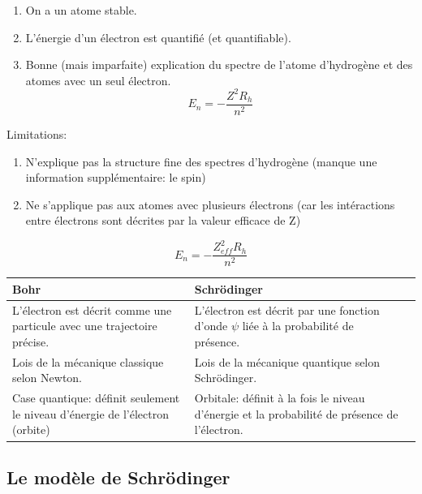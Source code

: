 \documentclass[10pt,a4paper]{book}
\begin{document}
\begin{enumerate}
\item On a un atome stable.
\item L'énergie d'un électron est quantifié (et quantifiable).
\item Bonne (mais imparfaite) explication du spectre de l'atome d'hydrogène et des atomes avec un seul électron.
\begin{displaymath}
E_n = -\frac{{Z^2}{R_h}}{n^2}
\end{displaymath}
\end{enumerate}
Limitations:
\begin{enumerate}
\item N'explique pas la structure fine des spectres d'hydrogène (manque une information supplémentaire: le spin)
\item Ne s'applique pas aux atomes avec plusieurs électrons (car les intéractions entre électrons sont décrites par la valeur efficace de Z)
\end{enumerate}
\begin{displaymath}
E_n = -\frac{{Z_{eff}^2}{R_h}}{n^2}
\end{displaymath}
\begin{center}
\begin{tabular}{ | m{5cm} | m{5cm}| m{5cm} | } 
  \hline
  Bohr & Schrödinger \\ 
  \hline
  L'électron est décrit comme une particule avec une trajectoire précise. & L'électron est décrit par une fonction d'onde $\psi$ liée à la probabilité de présence. \\ 
  \hline
  Lois de la mécanique classique selon Newton. & Lois de la mécanique quantique selon Schrödinger. \\ 
  \hline
  Case quantique: définit seulement le niveau d'énergie de l'électron (orbite) & Orbitale: définit à la fois le niveau d'énergie et la probabilité de présence de l'électron. \\
  \hline
\end{tabular}
\end{center}

\subsection{Le modèle de Schrödinger}
\end{document}
